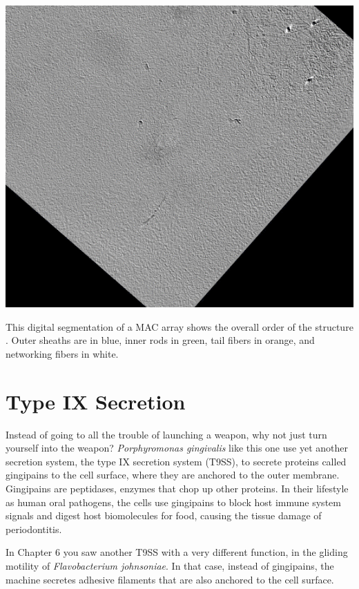 \documentclass[]{tufte-book}
\begin{document}
\includegraphics{img/schematics/9_7_2}

This digital segmentation of a MAC array shows the overall order of the structure \citep{shikuma2014}. Outer sheaths are in blue, inner rods in green, tail fibers in orange, and networking fibers in white.

\hypertarget{type-ix-secretion}{%
\section{Type IX Secretion}\label{type-ix-secretion}}

Instead of going to all the trouble of launching a weapon, why not just turn yourself into the weapon? \emph{Porphyromonas gingivalis} like this one use yet another secretion system, the type IX secretion system (T9SS), to secrete proteins called gingipains to the cell surface, where they are anchored to the outer membrane. Gingipains are peptidases, enzymes that chop up other proteins. In their lifestyle as human oral pathogens, the cells use gingipains to block host immune system signals and digest host biomolecules for food, causing the tissue damage of periodontitis.

In Chapter 6 you saw another T9SS with a very different function, in the gliding motility of \emph{Flavobacterium johnsoniae}. In that case, instead of gingipains, the machine secretes adhesive filaments that are also anchored to the cell surface.
\end{document}
